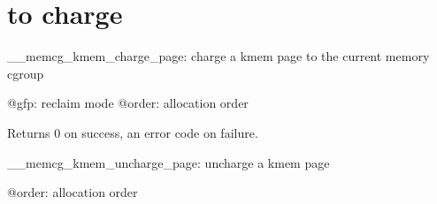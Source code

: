 \chapter{to charge }
\hypertarget{page}{}\label{page}
\+\_\+\+\_\+memcg\+\_\+kmem\+\_\+charge\+\_\+page:\+ charge a kmem page to the current memory cgroup  

@gfp:\+ reclaim mode @order:\+ allocation order

Returns 0 on success, an error code on failure.

\+\_\+\+\_\+memcg\+\_\+kmem\+\_\+uncharge\+\_\+page:\+ uncharge a kmem page  

@order:\+ allocation order 